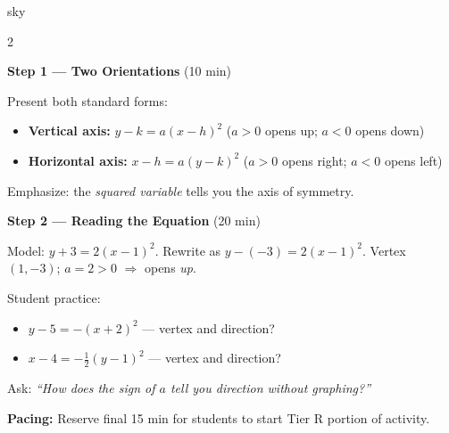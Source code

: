 \documentclass[10pt]{article}
\begin{document}
\begin{skillbox}{sky}
\begin{multicols}{2}

\textbf{Step 1 --- Two Orientations} (10 min)

Present both standard forms:
\begin{itemize}[leftmargin=1.2em, itemsep=2pt]
  \item \textbf{Vertical axis:} $y - k = a(x - h)^2$
    ($a > 0$ opens up; $a < 0$ opens down)
  \item \textbf{Horizontal axis:} $x - h = a(y - k)^2$
    ($a > 0$ opens right; $a < 0$ opens left)
\end{itemize}
Emphasize: the \emph{squared variable} tells you the axis of symmetry.

\columnbreak

\textbf{Step 2 --- Reading the Equation} (20 min)

Model: $y + 3 = 2(x - 1)^2$.
Rewrite as $y - (-3) = 2(x-1)^2$.
Vertex $(1, -3)$; $a = 2 > 0$ $\Rightarrow$ opens \emph{up}.

Student practice:
\begin{itemize}[leftmargin=1.2em, itemsep=2pt]
  \item $y - 5 = -(x + 2)^2$ --- vertex and direction?
  \item $x - 4 = -\tfrac{1}{2}(y - 1)^2$ --- vertex and direction?
\end{itemize}

Ask: \textit{``How does the sign of $a$ tell you direction without
graphing?''}

\end{multicols}

\smallskip
\textbf{Pacing:} Reserve final 15 min for students to start Tier R portion of activity.
\end{skillbox}

\vspace{0.08in}
\end{document}
